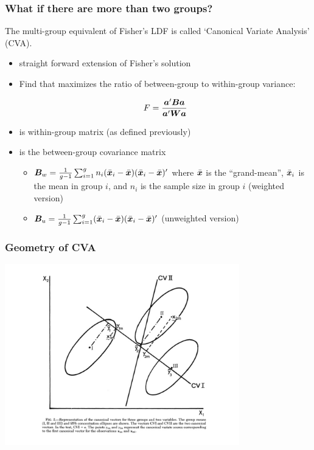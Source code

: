 \documentclass{beamer}
\begin{document}
\begin{frame}
  \frametitle{What if there are more than two groups?}

The multi-group equivalent of Fisher's LDF is called `Canonical Variate Analysis' (CVA).

\begin{itemize}
\item straight forward extension of Fisher's solution
\item Find  that maximizes the ratio of between-group to within-group variance:

\[
F = \frac{\bm{a}'\bm{B}\bm{a}}{\bm{a}'\bm{W}\bm{a}}
\]

\item {} is within-group matrix (as defined previously)
\item {} is the between-group covariance matrix
\begin{itemize}
    \item $\bm{B}_w = \frac{1}{g-1}\sum_{i=1}^{g} n_i(\bar{\bm{x}}_i - \bar{\bm{x}})(\bar{\bm{x}}_i - \bar{\bm{x}})'$ where $\bar{\bm{x}}$ is the ``grand-mean'', $\bar{\bm{x}}_i$ is the mean in group $i$, and $n_i$ is the sample size in group $i$ (weighted version)
    \item  $\bm{B}_u = \frac{1}{g-1}\sum_{i=1}^{g} (\bar{\bm{x}}_i - \bar{\bm{x}})(\bar{\bm{x}}_i - \bar{\bm{x}})'$ (unweighted version)
\end{itemize}

\end{itemize}



\end{frame}

\begin{frame}
  \frametitle{Geometry of CVA}

\begin{center}
\includegraphics[height=3.1in]{3group}
\end{center}

\end{frame}
\end{document}
